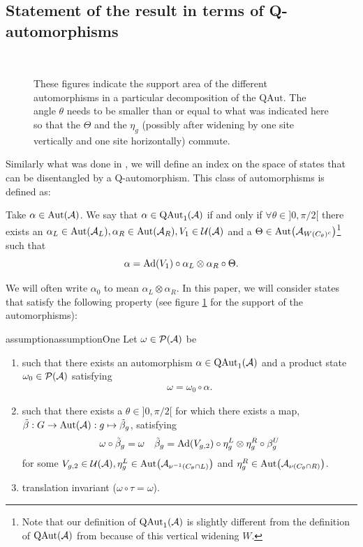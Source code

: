 \documentclass[11pt,a4paper,twoside]{article}
\numberwithin{equation}{section}
\begin{document}
	\subsection{Statement of the result in terms of Q-automorphisms}\label{sec:Results_2}
	\begin{figure}
		\centering
		\def\s{0.5}
		\resizebox{0.27\textwidth}{!}{%
			}
		$\qquad$
		\def\s{0.4}
		\resizebox{0.32\textwidth}{!}{%
			}
		\caption{These figures indicate the support area of the different automorphisms in a particular decomposition of the $\textrm{QAut}$. The angle $\theta$ needs to be smaller than or equal to what was indicated here so that the $\Theta$ and the $\eta_g$ (possibly after widening by one site vertically and one site horizontally) commute.}
		\label{fig:SetupWithQAutomorphism}
	\end{figure}
	Similarly what was done in \cite{ogata2021h3gmathbb}, we will define an index on the space of states that can be disentangled by a Q-automorphism. This class of automorphisms is defined as:
	\begin{definition}\label{def:QAut}
		Take $\alpha\in\Aut{\AA}$. We say that $\alpha\in\QAut{\AA}$ if and only if $\forall\theta\in]0,\pi/2[$ there exists an $\alpha_L\in\Aut{\AA_L},\alpha_R\in\Aut{\AA_R},V_1\in\UU(\AA)$ and a $\Theta\in\Aut{\AA_{W(C_\theta)^c}}$\footnote{Note that our definition of $\QAut{\AA}$ is slightly different from the definition of $\textrm{QAut}(\AA)$ from \cite{ogata2021h3gmathbb} because of this vertical widening $W$.} such that
		\begin{equation}
			\alpha=\Ad{V_1}\circ\alpha_L\otimes\alpha_R\circ\Theta.
		\end{equation}
	\end{definition}
	We will often write $\alpha_0$ to mean $\alpha_L\otimes\alpha_R$. In this paper, we will consider states that satisfy the following property (see figure \ref{fig:SetupWithQAutomorphism} for the support of the automorphisms):
	\begin{restatable}{assumption}{assumptionOne}\label{assumption}
		Let $\omega\in\PP(\AA)$ be
		\begin{enumerate}
			\item such that there exists an automorphism $\alpha\in\QAut{\AA}$ and a product state $\omega_0\in\PP(\AA)$ satisfying
			\begin{align}
				\omega=\omega_0\circ\alpha.
			\end{align}
			\item such that there exists a $\theta\in]0,\pi/2[$ for which there exists a map, $\tilde\beta:G\rightarrow\Aut{\AA}:g\mapsto\tilde\beta_g$, satisfying
			\begin{align}\label{eq:DecompositionOfBetaTilde}
				\omega\circ\tilde\beta_g&=\omega&\tilde\beta_g=\Ad{V_{g,2}}\circ\eta^L_g\otimes\eta^R_g\circ\beta^U_g
			\end{align}
			for some $V_{g,2}\in\UU(\AA),\eta^L_g\in\Aut{\AA_{\nu^{-1}(C_\theta\cap L)}}$ and $\eta^R_g\in\Aut{\AA_{\nu(C_\theta\cap R)}}$.
			\item translation invariant ($\omega\circ\tau=\omega$).
		\end{enumerate}
	\end{restatable}
\end{document}
